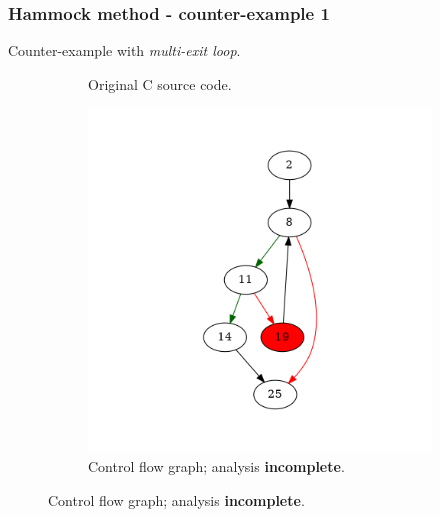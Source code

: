 \documentclass[aspectratio=1610]{beamer}
\begin{document}
\begin{frame}[noframenumbering]
	\frametitle{Hammock method - counter-example 1}
	Counter-example with \textit{multi-exit loop}.
	\begin{figure}[htbp]
		\centering
		\begin{subfigure}[b]{0.30\textwidth}
			\centering
			
			\caption{Original C source code.}
		\end{subfigure}
		\begin{subfigure}[b]{0.50\textwidth}
			\centering
			\includegraphics[height=0.6\paperheight]{inc/methods/hammock/counter-example/with-break/main_0001b.png}
			\caption{Control flow graph; analysis \textbf{incomplete}.}
		\end{subfigure}
	\end{figure}
\end{frame}



\end{document}
